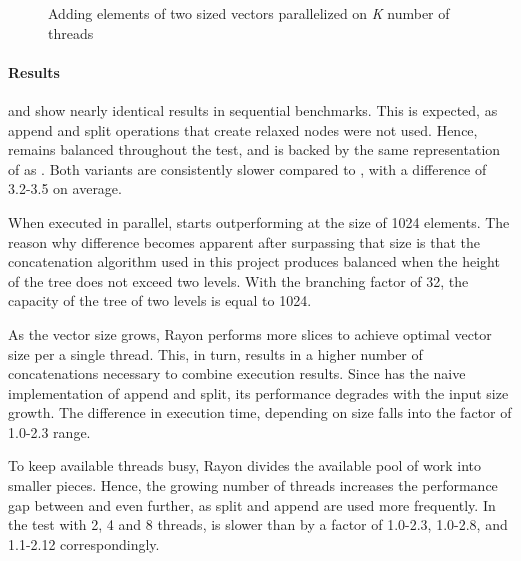 \begin{figure}[H]

    \label{fig:adding-two-vectors-par}
    \caption{Adding elements of two \n{} sized vectors parallelized on \emph{K} number of threads}
\end{figure}

\paragraph{Results}
\rbvec{} and \rrbvec{} show nearly identical results in sequential benchmarks. This is expected, as append and split operations that create relaxed nodes were not used. Hence, \rrbvec{} remains balanced throughout the test, and is backed by the same representation of \rrbtree{} as \rbvec{}. Both variants are consistently slower compared to \stdvec{}, with a difference of 3.2-3.5 on average.

When executed in parallel, \rrbvec{} starts outperforming \rbvec{} at the size of 1024 elements. The reason why difference becomes apparent after surpassing that size is that the concatenation algorithm used in this project produces balanced \rbtree{} when the height of the tree does not exceed two levels. With the branching factor of 32, the capacity of the tree of two levels is equal to 1024.

As the vector size grows, Rayon performs more slices to achieve optimal vector size per a single thread. This, in turn, results in a higher number of concatenations necessary to combine execution results. Since \rbvec{} has the naive implementation of append and split, its performance degrades with the input size growth. The difference in execution time, depending on size falls into the factor of 1.0-2.3 range.

To keep available threads busy, Rayon divides the available pool of work into smaller pieces. Hence, the growing number of threads increases the performance gap between \rbvec{} and \rrbvec{} even further, as split and append are used more frequently. In the test with 2, 4 and 8 threads, \rbvec{} is slower than \rrbvec{} by a factor of 1.0-2.3, 1.0-2.8, and 1.1-2.12 correspondingly.

